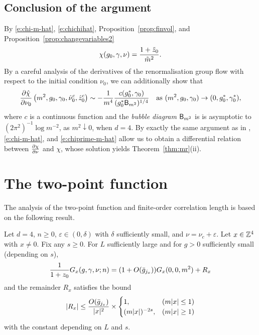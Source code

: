 \subsection{Conclusion of the argument}

By \eqref{e:chi-m-hat}, \eqref{e:chichihat}, Proposition~\ref{prop:finvol},
and Proposition~\ref{prop:changevariables2}
\begin{equation}
\chi(g_0, \gamma, \nu)
	=
\frac{1 + \tilde z_0}{\tilde m^2}.
\end{equation}
By a careful analysis of the derivatives of the renormalisation group flow with
respect to the initial condition $\nu_0$, we can additionally show that
\begin{equation}
\label{e:chiprime-m-hat}
\frac{\partial \hat\chi}{\partial \nu_0} \left(m^2,g_0, \gamma_0,\hat\nu_0^c, \hat z_0^c \right)
	\sim
-\frac{1}{m^4} \frac{c(g_0^*, \gamma_0)}{(g_0^*{\sf B}_{m^2})^{1/4}}
	\quad
\text{as $(m^2,g_0,\gamma_0) \rightarrow (0,g_0^*,\gamma_0^*)$},
\end{equation}
where $c$ is a continuous function
and the \emph{bubble diagram} ${\sf B}_{m^2}$ is
is asymptotic to $(2\pi^2)^{-1} \log m^{-2}$, as $m^2 \downarrow 0$, when $d = 4$.
By exactly the same argument as in \cite[Section~\ref{log-sec:pfsuscept}]{BBS-saw4-log},
\eqref{e:chi-m-hat}, and \eqref{e:chiprime-m-hat} allow us to obtain
a differential relation between $\frac{\partial \chi}{\partial \nu}$ and $\chi$,
whose solution yields Theorem~\ref{thm:mr}(ii).


\section{The two-point function}

The analysis of the two-point function and finite-order correlation length is
based on the following result.

\begin{prop}
\label{prop:R}
Let $d=4$, $n \ge 0$, $\varepsilon \in (0,\delta)$ with $\delta$ sufficiently small,
and $\nu = \nu_c + \varepsilon$.
Let $x \in {\mathbb Z}^4$ with $x \neq 0$.
Fix any $s \geq 0$.
For $L$ sufficiently large and for $g > 0$ sufficiently small (depending on $s$),
\begin{equation}
\label{e:Gab-to-sum-Rqj}
\frac{1}{1+z_0} G_x(g, \gamma, \nu; n) = (1 + O(\bar{g}_{j_x})) G_x(0, 0, m^2) + R_x
\end{equation}
and the remainder $R_x$ satisfies the bound
\begin{equation}
\label{e:Rab-bound}
|R_{x}|
	\le
\frac{O(\bar{g}_{j_{x}}) }{|x|^2}
	\times
\begin{cases}
1,				& (m|x|\le 1) \\
(m|x|)^{-2s},	& (m|x|\ge 1)
\end{cases}
\end{equation}
with the  constant depending on $L$ and $s$.
\end{prop}

